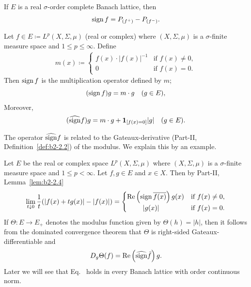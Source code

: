 If\/ $E$ is a real $\sigma$-order complete Banach lattice, then
\begin{equation}\label{eq:c2-2.5}
	\operatorname{sign} f = P_{(f^{+})} - P_{(f^{-})}.
\end{equation}
\begin{example}\label{ex:c2-2.2}
%
Let $f \in E \coloneq L^p(X,\Sigma,\mu)$ (real or complex) where $(X,\Sigma,\mu)$ is a $\sigma$-finite measure space and $1 \leq p \leq \infty$.
Define  
\begin{align*}
	m(x) \coloneq 
	\begin{cases}
        f(x)\cdot|f(x)|^{-1} & \text{if }  f(x)   \neq 0  , \\ 
    	0 & \text{if } f(x) = 0  .
	\end{cases}
\end{align*}
Then $\operatorname{sign} f$ is the multiplication operator defined by $m$; \ie
\[
	(\operatorname{sign} f)g = m \cdot g \quad (g \in E), 
\]
Moreover, 
\[
	(\widehat{\operatorname{sign}} f)g = m \cdot g + \mathbf{1}_{[f(x)=0]}|g| \quad (g \in E).
\]
\end{example}
The operator $\widehat{\operatorname{sign}} f$ is related to the Gateaux-derivative (Part-II, Definition~\ref{def:b2-2.2}) of the modulus.
We explain this by an example.
\begin{example}\label{ex:c2-2.3}
%
Let $E$ be the real or complex space $L^p(X,\Sigma,\mu)$ where $(X,\Sigma,\mu)$ is a $\sigma$-finite measure space and $1 \leq p < \infty$.
Let $f,g \in E$ and $x \in X$.
Then by Part-II, Lemma~\ref{lem:b2-2.4}
\begin{align*}
\lim_{t \downarrow 0} \frac{1}{t} (|f(x)+tg(x)|-|f(x)|) = 
\begin{cases}
    \mathop{}\!\mathrm{Re} \left(\operatorname{sign} \overline{f(x)}\right)g(x) & \text{if } f(x) \neq 0  , \\
    \ \quad\quad|g(x)| & \text{if } f(x) = 0  .
\end{cases}
\end{align*}
If\/ $\Theta \colon E \to E_{+}$ denotes the modulus function given by $\Theta(h) = |h|$, then it follows from the dominated convergence theorem that $\Theta$ is right-sided Gateaux-differentiable and
\begin{equation}\label{eq:c2-2.6}
D_{g}\Theta(f) = \mathop{}\!\mathrm{Re}\left(\widehat{\operatorname{sign}} \bar{f}\right)g.
\end{equation}
Later we will see that Eq.~   holds in every Banach lattice with order continuous norm.
\end{example}
